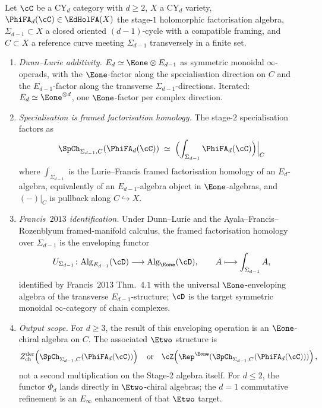 \begin{proposition}
\label{prop:dunn-lurie-sp-factorisation-homology}
Let $\cC$ be a CY$_d$ category with $d \geq 2$, $X$ a CY$_d$ variety, $\PhiFA_d(\cC) \in \EdHolFA(X)$ the stage-$1$ holomorphic factorisation algebra, $\Sigma_{d-1} \subset X$ a closed oriented $(d{-}1)$-cycle with a compatible framing, and $C \subset X$ a reference curve meeting $\Sigma_{d-1}$ transversely in a finite set.
\begin{enumerate}[label=\textup{(\roman*)}]
 \item \emph{Dunn--Lurie additivity.}
 $E_d \simeq \Eone \otimes E_{d-1}$ as symmetric monoidal $\infty$-operads, with the $\Eone$-factor along the specialisation direction on $C$ and the $E_{d-1}$-factor along the transverse $\Sigma_{d-1}$-directions. Iterated: $E_d \simeq \Eone^{\otimes d}$, one $\Eone$-factor per complex direction.
 \item \emph{Specialisation is framed factorisation homology.} The stage-$2$ specialisation factors as
 \[
 \SpCh_{\Sigma_{d-1}, C}(\PhiFA_d(\cC))
 \;\simeq\;
 \Bigl(\int_{\Sigma_{d-1}} \PhiFA_d(\cC)\Bigr)\Big|_C
 \]
 where $\int_{\Sigma_{d-1}}$ is the Lurie--Francis framed factorisation homology of an $E_d$-algebra, equivalently of an $E_{d-1}$-algebra object in $\Eone$-algebras, and $(-)|_C$ is pullback along $C \hookrightarrow X$.
 \item \emph{Francis~$2013$ identification.} Under Dunn--Lurie and the Ayala--Francis--Rozenblyum framed-manifold calculus, the framed factorisation homology over $\Sigma_{d-1}$ is the enveloping functor
 \[
 U_{\Sigma_{d-1}} \colon \mathrm{Alg}_{E_{d-1}}(\cD) \longrightarrow \mathrm{Alg}_{\Eone}(\cD),
 \qquad
 A \longmapsto \int_{\Sigma_{d-1}} A,
 \]
 identified by Francis~$2013$ \textup{Thm.~$4.1$} with the universal $\Eone$-enveloping algebra of the transverse \(E_{d-1}\)-structure; $\cD$ is the target symmetric monoidal $\infty$-category of chain complexes.
 \item \emph{Output scope.} For $d\geq3$, the result of this enveloping operation is an $\Eone$-chiral algebra on $C$.  The associated $\Etwo$ structure is
 \[
  Z^{\mathrm{der}}_{\mathrm{ch}}\!\left(\SpCh_{\Sigma_{d-1},C}(\PhiFA_d(\cC))\right)
  \quad\text{or}\quad
  \cZ\!\left(\Rep^{\Eone}(\SpCh_{\Sigma_{d-1},C}(\PhiFA_d(\cC)))\right),
 \]
 not a second multiplication on the Stage-2 algebra itself.  For $d\leq2$, the functor $\Phi_d$ lands directly in $\Etwo$-chiral algebras; the $d=1$ commutative refinement is an $E_\infty$ enhancement of that $\Etwo$ target.
\end{enumerate}
\end{proposition}

